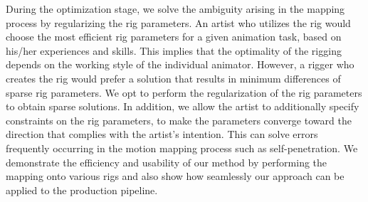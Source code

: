 During the optimization stage, we solve the ambiguity arising in the mapping process by regularizing the rig parameters. 
An artist who utilizes the rig would choose the most efficient rig parameters for a given animation task, based on his/her experiences and skills. 
This implies that the optimality of the rigging depends on the working style of the individual animator. 
However, a rigger who creates the rig would prefer a solution that results in minimum differences of sparse rig parameters. 
We opt to perform the regularization of the rig parameters to obtain sparse solutions. 
In addition, we allow the artist to additionally specify constraints on the rig parameters, to make the parameters converge toward the direction that complies with the artist's intention. 
This can solve errors frequently occurring in the motion mapping process such as self-penetration. 
We demonstrate the efficiency and usability of our method by performing the mapping onto various rigs and also show how seamlessly our approach can be applied to the production pipeline.




